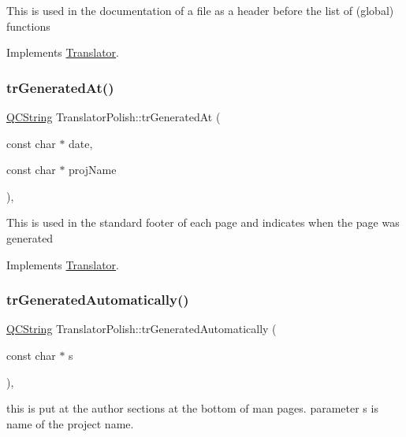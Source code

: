 This is used in the documentation of a file as a header before the list of (global) functions 

Implements \mbox{\hyperlink{class_translator}{Translator}}.

\mbox{\label{class_translator_polish_a80e062bbff8e4ee541ac336cbe8943b7}} 
\subsubsection{\texorpdfstring{trGeneratedAt()}{trGeneratedAt()}}
{\footnotesize\ttfamily \mbox{\hyperlink{class_q_c_string}{Q\+C\+String}} Translator\+Polish\+::tr\+Generated\+At (\begin{DoxyParamCaption}\item[{const char $\ast$}]{date,  }\item[{const char $\ast$}]{proj\+Name }\end{DoxyParamCaption})\hspace{0.3cm}{\ttfamily [inline]}, {\ttfamily [virtual]}}

This is used in the standard footer of each page and indicates when the page was generated 

Implements \mbox{\hyperlink{class_translator}{Translator}}.

\mbox{\label{class_translator_polish_a0ac0faca1141da2427d0f0f8fa2cd798}} 
\subsubsection{\texorpdfstring{trGeneratedAutomatically()}{trGeneratedAutomatically()}}
{\footnotesize\ttfamily \mbox{\hyperlink{class_q_c_string}{Q\+C\+String}} Translator\+Polish\+::tr\+Generated\+Automatically (\begin{DoxyParamCaption}\item[{const char $\ast$}]{s }\end{DoxyParamCaption})\hspace{0.3cm}{\ttfamily [inline]}, {\ttfamily [virtual]}}

this is put at the author sections at the bottom of man pages. parameter s is name of the project name. 

